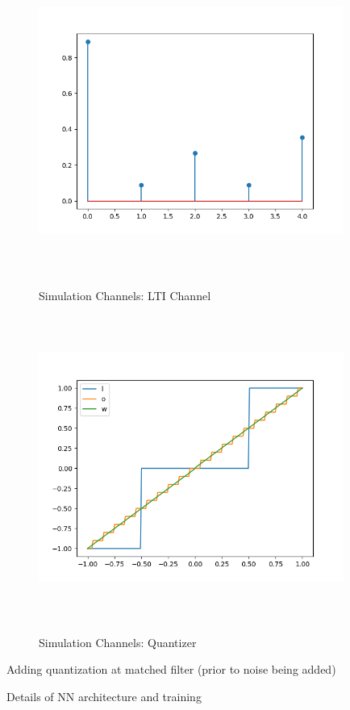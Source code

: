 \documentclass[12pt,a4paper]{report}
\begin{document}
\begin{figure}[H]
\centering
	  \caption{Simulation Channels: LTI Channel}
	\includegraphics[width=10cm,height = 10cm]{system_model/lti_channel}
	  \label{fig:LTI Channel}
\end{figure}
\begin{figure}[H]
\centering
	  \caption{Simulation Channels: Quantizer}
	\includegraphics[width=10cm,height = 10cm]{system_model/quantizer}
	  \label{fig:Quantized Channel}
\end{figure}



Adding quantization at matched filter (prior to noise being added)


Details of NN architecture and training
\end{document}
